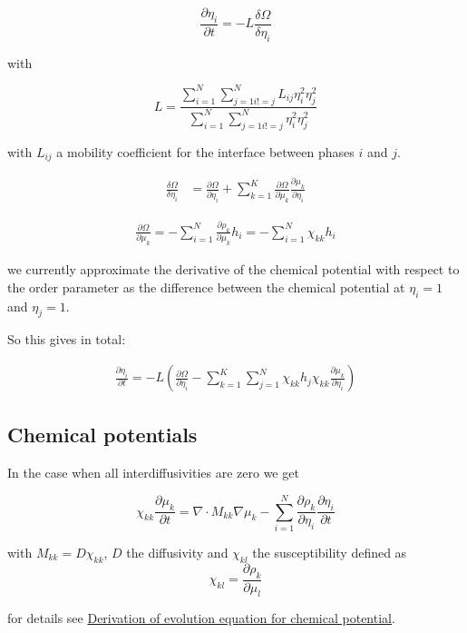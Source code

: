\documentclass[11pt]{article}
\begin{document}
$$
\frac{\partial \eta_i}{\partial t} = -L \frac{\delta \Omega}{\delta \eta_i}
$$

with

$$
L = \frac{ \sum_{i=1}^N \sum_{j=1 i!=j}^N L_{ij} \eta_i^2 \eta_j^2 }{ \sum_{i=1}^N
\sum_{j=1 i!=j}^N \eta_i^2 \eta_j^2 }
$$

with \(L_{ij}\) a mobility coefficient for the interface between phases \(i\) and \(j\).

\begin{align*}
\frac{\delta \Omega}{\delta \eta_i} &= \frac{\partial \Omega}{\partial \eta_i} + \sum_{k=1}^K \frac{\partial \Omega}{\partial \mu_k}\frac{\partial \mu_k}{\partial \eta_i}
\end{align*}

\begin{align*}
\frac{\partial \Omega}{\partial \mu_k} = -\sum_{i=1}^N \frac{\partial \rho_k}{\partial \mu_k} h_i = -\sum_{i=1}^N \chi_{kk} h_i
\end{align*}

we currently approximate the derivative of the chemical potential with respect to the order parameter as the difference between the chemical potential at \(\eta_i = 1\) and \(\eta_j = 1\).

So this gives in total:

\begin{align*}
\frac{\partial \eta_i}{\partial t} = -L \left( \frac{\partial \Omega}{\partial \eta_i} - \sum_{k=1}^K \sum_{j=1}^N \chi_{kk} h_j \chi_{kk} \frac{\partial \mu_k}{\partial \eta_i} \right)
\end{align*}

\subsection{Chemical potentials}
\label{sec:org3bc8283}

In the case when all interdiffusivities are zero we get

$$
\chi_{kk} \frac{\partial \mu_k}{\partial t} = \nabla \cdot M_{kk} \nabla \mu_k - \sum_{i=1}^N \frac{\partial \rho_k}{\partial \eta_i} \frac{\partial \eta_i}{\partial t}
$$

with \(M_{kk} = D \chi_{kk}\), \(D\) the diffusivity and \(\chi_{kl}\) the susceptibility defined as
$$
\chi_{kl} = \frac{\partial \rho_k}{\partial \mu_l}
$$

for details see \hyperref[sec:orgb8d1e50]{Derivation of evolution equation for chemical potential}.
\end{document}
